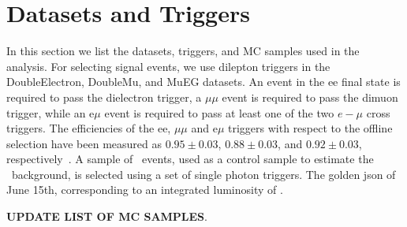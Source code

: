 \clearpage

\section{Datasets and Triggers}
\label{sec:datasets}

In this section we list the datasets, triggers, and MC samples used in the analysis. For selecting signal
events, we use dilepton triggers in the DoubleElectron, DoubleMu, and MuEG datasets. 
An event in the ee final state is required to pass the dielectron trigger, a 
$\mu\mu$ event is required to pass the dimuon trigger, while an e$\mu$ event is required to pass at least one 
of the two $e-\mu$ cross triggers. The efficiencies of the ee, $\mu\mu$ and e$\mu$ triggers with respect to the
offline selection have been measured as $0.95\pm0.03$, $0.88\pm0.03$, and $0.92\pm0.03$, respectively~\cite{ref:SSAN}.  
A sample of \gjets\ events, used as a control sample to estimate the \zjets\
background, is selected using a set of single photon triggers.
The golden json of June 15th, corresponding to an integrated luminosity of \lumi. 

{\bf UPDATE LIST OF MC SAMPLES}.

